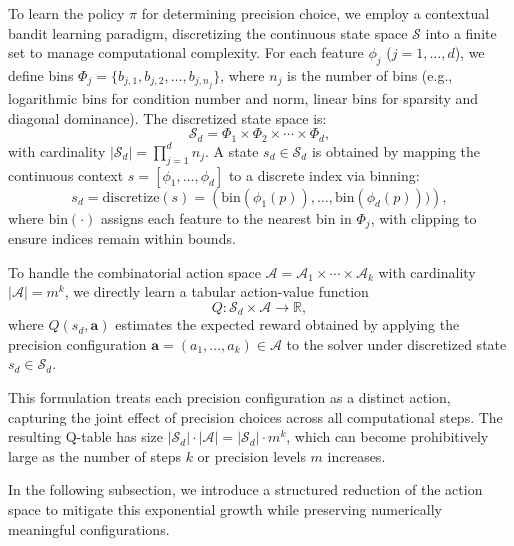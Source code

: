 \documentclass[Afour,sageh,times]{sagej}
\theoremstyle{plain}
\theoremstyle{definition}
\begin{document}
To learn the policy $\pi$ for determining precision choice, we employ a contextual bandit learning paradigm, discretizing the continuous state space $\mathcal{S}$ into a finite set to manage computational complexity. For each feature $\phi_j$ ($j = 1, \ldots, d$), we define bins $\Phi_j = \{ b_{j,1}, b_{j,2}, \ldots, b_{j,n_j} \}$, where $n_j$ is the number of bins (e.g., logarithmic bins for condition number and norm, linear bins for sparsity and diagonal dominance). The discretized state space is:
\begin{equation}\label{eq:discretized_state_space}
\mathcal{S}_d = \Phi_1 \times \Phi_2 \times \cdots \times \Phi_{d},
\end{equation}
with cardinality $|\mathcal{S}_d| = \prod_{j=1}^{d} n_j$. A state $s_d \in \mathcal{S}_d$ is obtained by mapping the continuous context $s = [\phi_1, \ldots, \phi_d]$ to a discrete index via binning:
\begin{equation}
s_d = \text{discretize}(s) = \left( \text{bin}(\phi_1(p)), \ldots, \text{bin}(\phi_d(p))) \right),
\end{equation}
where $\text{bin}(\cdot)$ assigns each feature to the nearest bin in $\Phi_j$, with clipping to ensure indices remain within bounds.

To handle the combinatorial action space $\mathcal{A} = \mathcal{A}_1 \times \cdots \times \mathcal{A}_k$
with cardinality $|\mathcal{A}| = m^k$, we directly learn a tabular action-value function
\[
Q : \mathcal{S}_d \times \mathcal{A} \to \mathbb{R},
\]
where $Q(s_d, \mathbf{a})$ estimates the expected reward obtained by applying the
precision configuration $\mathbf{a} = (a_1, \ldots, a_k) \in \mathcal{A}$
to the solver under discretized state $s_d \in \mathcal{S}_d$.

This formulation treats each precision configuration as a distinct action,
capturing the joint effect of precision choices across all computational steps.
The resulting Q-table has size $|\mathcal{S}_d| \cdot |\mathcal{A}| = |\mathcal{S}_d| \cdot m^k$,
which can become prohibitively large as the number of steps $k$ or precision levels $m$ increases.

In the following subsection, we introduce a structured reduction of the action space
to mitigate this exponential growth while preserving numerically meaningful configurations.
\end{document}
